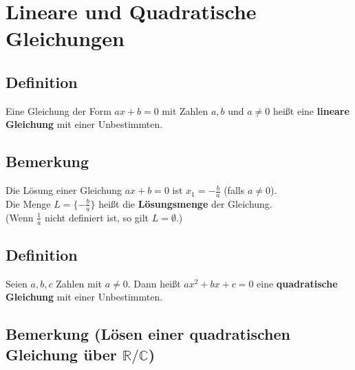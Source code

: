 \section{Lineare und Quadratische Gleichungen}

\subsection[Lineare Gleichungen]{Definition}

	Eine Gleichung der Form $ax+b=0$ mit Zahlen $a,b$ und $a\neq 0$ heißt eine \textbf{lineare Gleichung}
	mit einer Unbestimmten.
		

\subsection{Bemerkung}

	Die Lösung einer Gleichung $ax+b=0$ ist $x_1=-\frac{b}{a}$ (falls $a \neq 0$).\\
	Die Menge $L=\{- \frac{b}{a}\}$ heißt die \textbf{Lösungsmenge} der Gleichung. \\
	(Wenn $\frac{1}{a}$ nicht definiert ist, so gilt $L=\emptyset$.)
	
	
\subsection[Quadratische Gleichungen]{Definition}

	Seien $a,b,c$ Zahlen mit $a\neq 0$. Dann heißt $ax^2+bx+c=0$ eine \textbf{quadratische Gleichung}
	mit einer Unbestimmten.
	

\subsection[Lösen einer quadratischen Gleichung über $\mathbb{R}/\mathbb{C}$]{Bemerkung (Lösen einer quadratischen Gleichung über $\mathbb{R}/\mathbb{C}$)}

